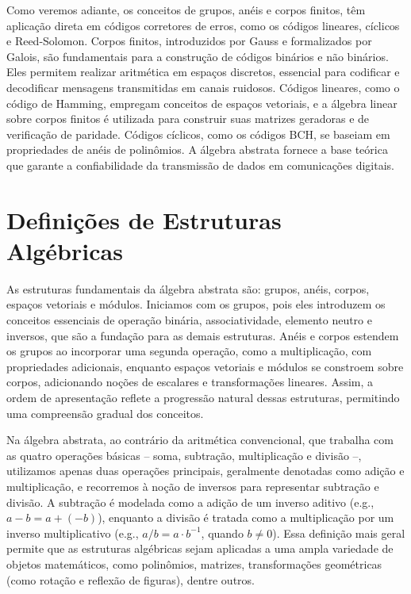 Como veremos adiante, os conceitos de grupos, anéis e corpos finitos, têm
aplicação direta em códigos corretores de erros, como os códigos lineares,
cíclicos e Reed-Solomon. Corpos finitos, introduzidos por Gauss e formalizados
por Galois, são fundamentais para a construção de códigos binários e não
binários. Eles permitem realizar aritmética em espaços discretos, essencial
para codificar e decodificar mensagens transmitidas em canais ruidosos. Códigos
lineares, como o código de Hamming, empregam conceitos de espaços vetoriais, e
a álgebra linear sobre corpos finitos é utilizada para construir suas matrizes
geradoras e de verificação de paridade. Códigos cíclicos, como os códigos BCH,
se baseiam em propriedades de anéis de polinômios. A álgebra abstrata fornece a
base teórica que garante a confiabilidade da transmissão de dados em
comunicações digitais.




\section{Definições de Estruturas Algébricas}

As estruturas fundamentais da álgebra abstrata são: grupos, anéis, corpos,
espaços vetoriais e módulos. Iniciamos com os grupos, pois eles introduzem os
conceitos essenciais de operação binária, associatividade, elemento neutro e
inversos, que são a fundação para as demais estruturas. Anéis e corpos estendem
os grupos ao incorporar uma segunda operação, como a multiplicação, com
propriedades adicionais, enquanto espaços vetoriais e módulos se constroem
sobre corpos, adicionando noções de escalares e transformações lineares. Assim,
a ordem de apresentação reflete a progressão natural dessas estruturas,
permitindo uma compreensão gradual dos conceitos.

Na álgebra abstrata, ao contrário da aritmética convencional, que trabalha com
as quatro operações básicas -- soma, subtração, multiplicação e divisão --,
utilizamos apenas duas operações principais, geralmente denotadas como adição e
multiplicação, e recorremos à noção de inversos para representar subtração e
divisão. A subtração é modelada como a adição de um inverso aditivo (e.g., $a - b = a + (-b)$), 
enquanto a divisão é tratada como a multiplicação por um
inverso multiplicativo (e.g., $a / b = a \cdot b^{-1}$, quando $b \neq 0$). 
Essa definição mais geral permite que as estruturas algébricas sejam
aplicadas a uma ampla variedade de objetos matemáticos, como polinômios,
matrizes, transformações geométricas (como rotação e reflexão de figuras), dentre outros.





